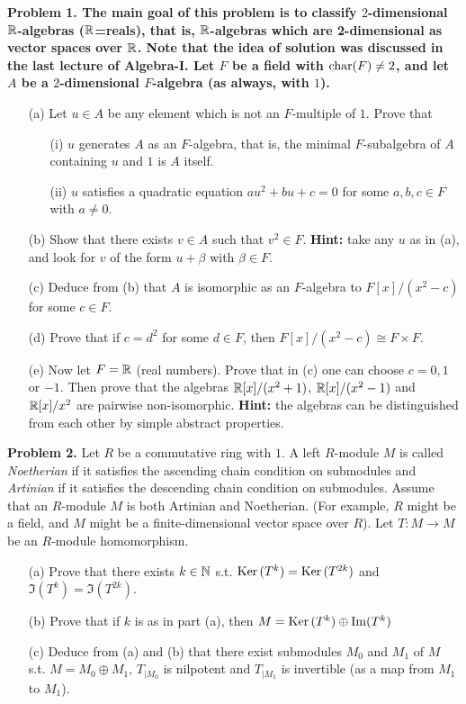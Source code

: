 \documentclass[12pt]{article}
\begin{document}
\bf{Problem 1. }\rm The main goal of this problem is to classify
$2$-dimensional ${\mathbb R}$-algebras (${\mathbb R}$=reals), that is,
${\mathbb R}$-algebras which are 2-dimensional as vector spaces over ${\mathbb R}$.
Note that the idea of solution was discussed in the last lecture of Algebra-I.
\skv
Let $F$ be a field with ${\rm char}(F)\neq 2$, and
let $A$ be a $2$-dimensional $F$-algebra (as always, with $1$).
\begin{itemize}
\item[(a)] Let $u\in A$ be any element which is not an $F$-multiple of $1$.
Prove that
\begin{itemize}
\item[(i)] $u$ generates $A$ as an $F$-algebra, that is, the minimal $F$-subalgebra of $A$ containing $u$ and $1$ is $A$ itself.
\item[(ii)] $u$ satisfies a quadratic equation $au^2+bu+c=0$
for some $a,b,c\in F$ with $a\neq 0$.
\end{itemize}
\item[(b)] Show that there exists $v\in A$ such that $v^2\in F$.
{\bf Hint:} take any $u$ as in (a), and look for $v$ of the form
$u+\beta$ with $\beta\in F$.
\item[(c)] Deduce from (b) that $A$ is isomorphic as an $F$-algebra
to  $F[x]/(x^2-c)$ for some $c\in F$. 
\item[(d)] Prove that if $c=d^2$ for some $d\in F$, then $F[x]/(x^2-c)\cong F\times F$.
\item[(e)] Now let $F={\mathbb R}$ (real numbers). Prove that in (c) one can choose
$c=0,1$ or $-1$. Then prove that the algebras ${\mathbb R}[x]/(x^2+1)$, ${\mathbb R}[x]/(x^2-1)$ and ${\mathbb R}[x]/x^2$ 
are pairwise non-isomorphic. {\bf Hint:} the algebras can be distinguished from
each other by simple abstract properties.
\end{itemize}

{\bf Problem 2.} Let $R$ be a commutative ring with $1$. A left $R$-module $M$ is called {\it Noetherian} if it satisfies the ascending chain condition on submodules and {\it Artinian}
if it satisfies the descending chain condition on submodules. Assume that an $R$-module $M$
is both Artinian and Noetherian. (For example, $R$ might be a field, and $M$ might be a 
finite-dimensional vector space over $R$). Let $T:M\to M$ be an $R$-module homomorphism.
\begin{itemize}
\item[(a)] Prove that there exists $k\in{\mathbb N}$ s.t. ${\rm Ker\,}(T^k)={\rm Ker\,}(T^{2k})$ and $\Im(T^k)=\Im(T^{2k})$.
\item[(b)] Prove that if $k$ is as in part (a), then $M={\rm Ker\,}(T^k)\oplus {\rm Im}(T^k)$
\item[(c)] Deduce from (a) and (b) that there exist submodules $M_0$ and $M_1$ of $M$
s.t. $M=M_0\oplus M_1$, $T_{| M_0}$ is nilpotent and $T_{|M_1}$ is invertible (as a map from $M_1$ to $M_1$).
\end{itemize}
\end{document}
